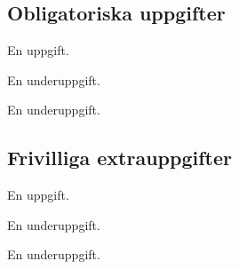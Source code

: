 

\subsection{Obligatoriska uppgifter}

\Task En uppgift.

\Subtask En underuppgift.

\Subtask En underuppgift.

\subsection{Frivilliga extrauppgifter}

\Task En uppgift.

\Subtask En underuppgift.

\Subtask En underuppgift.